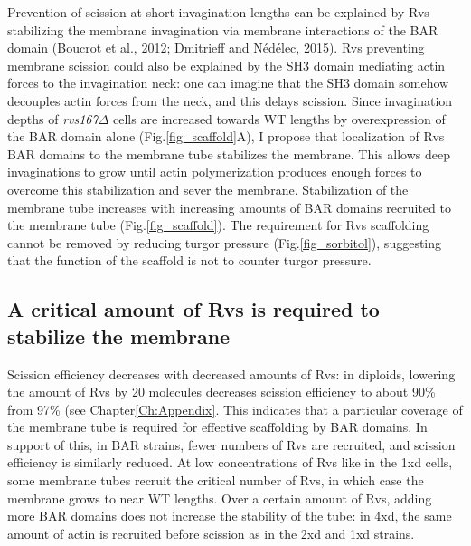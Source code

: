 Prevention of scission at short invagination lengths can be explained by Rvs stabilizing the membrane invagination via membrane interactions of the BAR domain (Boucrot et al., 2012; Dmitrieff and Nédélec, 2015). Rvs preventing membrane scission could also be explained by the SH3 domain mediating actin forces to the invagination neck: one can imagine that the SH3 domain somehow decouples actin forces from the neck, and this delays scission. Since invagination depths of \textit{rvs167$\Delta$} cells are increased towards WT lengths by overexpression of the BAR domain alone (Fig.\ref{fig_scaffold}A), I propose that localization of Rvs BAR domains to the membrane tube stabilizes the membrane. This allows deep invaginations to grow until actin polymerization produces enough forces to overcome this stabilization and sever the membrane. Stabilization of the membrane tube increases with increasing amounts of BAR domains recruited to the membrane tube (Fig.\ref{fig_scaffold}). The requirement for Rvs scaffolding cannot be removed by reducing turgor pressure (Fig.\ref{fig_sorbitol}), suggesting that the function of the scaffold is not to counter turgor pressure. 


\subsection{A critical amount of Rvs is required to stabilize the membrane }

\vspace{5mm}
Scission efficiency decreases with decreased amounts of Rvs: in diploids, lowering the amount of Rvs by 20 molecules decreases scission efficiency to about 90\% from 97\% (see Chapter\ref{Ch:Appendix}. This indicates that a particular coverage of the membrane tube is required for effective scaffolding by BAR domains. In support of this, in BAR strains, fewer numbers of Rvs are recruited, and scission efficiency is similarly reduced. At low concentrations of Rvs like in the 1xd cells, some membrane tubes recruit the critical number of Rvs, in which case the membrane grows to near WT lengths. Over a certain amount of Rvs, adding more BAR domains does not increase the stability of the tube: in 4xd, the same amount of actin is recruited before scission as in the 2xd and 1xd strains. 

